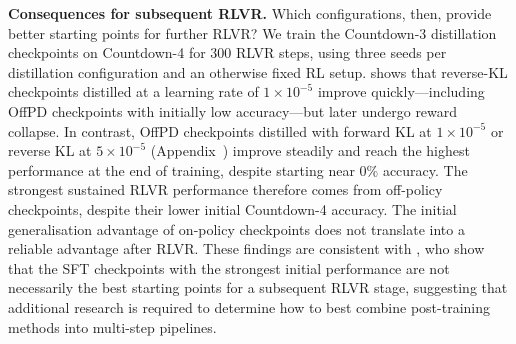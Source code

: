 \documentclass{article} %
\theoremstyle{plain}
\theoremstyle{definition}
\theoremstyle{remark}
\begin{document}
\textbf{Consequences for subsequent RLVR.} Which configurations, then, provide better starting points for further RLVR? We train the Countdown-3 distillation checkpoints on Countdown-4 for 300 RLVR steps, using three seeds per distillation configuration and an otherwise fixed RL setup.  shows that reverse-KL checkpoints distilled at a learning rate of $1\times10^{-5}$ improve quickly---including OffPD checkpoints with initially low accuracy---but later undergo reward collapse. In contrast, OffPD checkpoints distilled with forward KL at $1\times10^{-5}$ or reverse KL at $5\times10^{-5}$ (Appendix~) improve steadily and reach the highest performance at the end of training, despite starting near $0\%$ accuracy. 
The strongest sustained RLVR performance therefore comes from off-policy checkpoints, despite their lower initial Countdown-4 accuracy. The initial generalisation advantage of on-policy checkpoints does not translate into a reliable advantage after RLVR. These findings are consistent with \citet{zhang_good_2026}, who show that the SFT checkpoints with the strongest initial performance are not necessarily the best starting points for a subsequent RLVR stage, suggesting that additional research is required to determine how to best combine post-training methods into multi-step pipelines.

\end{document}
